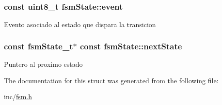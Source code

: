 \subsubsection[{\texorpdfstring{event}{event}}]{\setlength{\rightskip}{0pt plus 5cm}const uint8\+\_\+t fsm\+State\+::event}\hypertarget{structfsmState_ae7a35fc5aec6884f24d5c8c293af155b}{}\label{structfsmState_ae7a35fc5aec6884f24d5c8c293af155b}
Evento asociado al estado que dispara la transicion 
\subsubsection[{\texorpdfstring{next\+State}{nextState}}]{\setlength{\rightskip}{0pt plus 5cm}const {\bf fsm\+State\+\_\+t}$\ast$ const fsm\+State\+::next\+State}\hypertarget{structfsmState_aec2706243c56627e33f8744dc38b964a}{}\label{structfsmState_aec2706243c56627e33f8744dc38b964a}
Puntero al proximo estado 

The documentation for this struct was generated from the following file\+:\begin{DoxyCompactItemize}
\item 
inc/\hyperlink{fsm_8h}{fsm.\+h}\end{DoxyCompactItemize}
